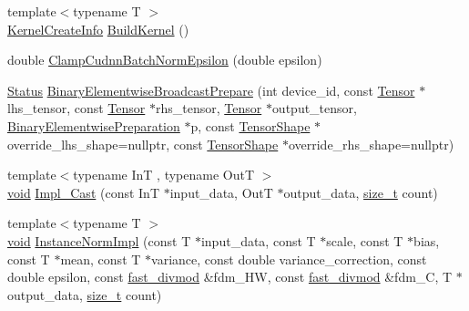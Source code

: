\begin{DoxyCompactItemize}
\item 
{\footnotesize template$<$typename T $>$ }\\\mbox{\hyperlink{structonnxruntime_1_1KernelCreateInfo}{Kernel\+Create\+Info}} \mbox{\hyperlink{namespaceonnxruntime_1_1cuda_a4cf9fae99ef47f1c08fda7013e95bca5}{Build\+Kernel}} ()
\item 
double \mbox{\hyperlink{namespaceonnxruntime_1_1cuda_ada3a9cb32e02dd0c20c7d959500aac74}{Clamp\+Cudnn\+Batch\+Norm\+Epsilon}} (double epsilon)
\item 
\mbox{\hyperlink{classonnxruntime_1_1common_1_1Status}{Status}} \mbox{\hyperlink{namespaceonnxruntime_1_1cuda_abdb130419be4fca46b9b5a2f288e3f37}{Binary\+Elementwise\+Broadcast\+Prepare}} (int device\+\_\+id, const \mbox{\hyperlink{classonnxruntime_1_1Tensor}{Tensor}} $\ast$lhs\+\_\+tensor, const \mbox{\hyperlink{classonnxruntime_1_1Tensor}{Tensor}} $\ast$rhs\+\_\+tensor, \mbox{\hyperlink{classonnxruntime_1_1Tensor}{Tensor}} $\ast$output\+\_\+tensor, \mbox{\hyperlink{structonnxruntime_1_1cuda_1_1BinaryElementwisePreparation}{Binary\+Elementwise\+Preparation}} $\ast$p, const \mbox{\hyperlink{classonnxruntime_1_1TensorShape}{Tensor\+Shape}} $\ast$override\+\_\+lhs\+\_\+shape=nullptr, const \mbox{\hyperlink{classonnxruntime_1_1TensorShape}{Tensor\+Shape}} $\ast$override\+\_\+rhs\+\_\+shape=nullptr)
\item 
{\footnotesize template$<$typename InT , typename OutT $>$ }\\\mbox{\hyperlink{mlasi_8h_a88f941d423cb2a819b70a1358982b1a6}{void}} \mbox{\hyperlink{namespaceonnxruntime_1_1cuda_a5ec73c46b242d6ea59dd9965bc34e13f}{Impl\+\_\+\+Cast}} (const InT $\ast$input\+\_\+data, OutT $\ast$output\+\_\+data, \mbox{\hyperlink{mlasi_8h_a503efbc1c6e50825320ad909366b78ab}{size\+\_\+t}} count)
\item 
{\footnotesize template$<$typename T $>$ }\\\mbox{\hyperlink{mlasi_8h_a88f941d423cb2a819b70a1358982b1a6}{void}} \mbox{\hyperlink{namespaceonnxruntime_1_1cuda_af407fc77f1d77fc8f5a4a421d8545fbd}{Instance\+Norm\+Impl}} (const T $\ast$input\+\_\+data, const T $\ast$scale, const T $\ast$bias, const T $\ast$mean, const T $\ast$variance, const double variance\+\_\+correction, const double epsilon, const \mbox{\hyperlink{classonnxruntime_1_1cuda_1_1fast__divmod}{fast\+\_\+divmod}} \&fdm\+\_\+\+HW, const \mbox{\hyperlink{classonnxruntime_1_1cuda_1_1fast__divmod}{fast\+\_\+divmod}} \&fdm\+\_\+C, T $\ast$output\+\_\+data, \mbox{\hyperlink{mlasi_8h_a503efbc1c6e50825320ad909366b78ab}{size\+\_\+t}} count)

\end{DoxyCompactItemize}
